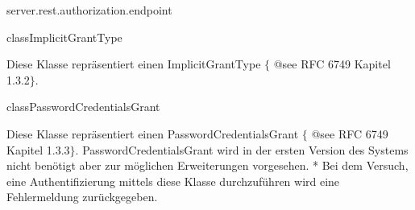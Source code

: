 \begin{texdocpackage}{server.rest.authorization.endpoint}
\begin{texdocclass}{class}{ImplicitGrantType}
\label{texdoclet:edu.kit.informatik.studyplan.server.rest.authorization.endpoint.ImplicitGrantType}
\begin{texdocclassintro}
Diese Klasse repräsentiert einen ImplicitGrantType $\{$ @see RFC 6749 Kapitel 1.3.2$\}$.\end{texdocclassintro}
\begin{texdocclassconstructors}
\end{texdocclassconstructors}
\begin{texdocclassmethods}
\end{texdocclassmethods}
\end{texdocclass}


\begin{texdocclass}{class}{PasswordCredentialsGrant}
\label{texdoclet:edu.kit.informatik.studyplan.server.rest.authorization.endpoint.PasswordCredentialsGrant}
\begin{texdocclassintro}
Diese Klasse repräsentiert einen PasswordCredentialsGrant  $\{$ @see RFC 6749 Kapitel 1.3.3$\}$.
 PasswordCredentialsGrant wird in der ersten Version des Systems nicht benötigt aber zur möglichen 
 Erweiterungen vorgesehen.
  * Bei dem Versuch, eine Authentifizierung mittels diese Klasse durchzuführen wird eine Fehlermeldung
 zurückgegeben.\end{texdocclassintro}
\begin{texdocclassconstructors}
\end{texdocclassconstructors}
\begin{texdocclassmethods}
\end{texdocclassmethods}
\end{texdocclass}



\end{texdocpackage}
